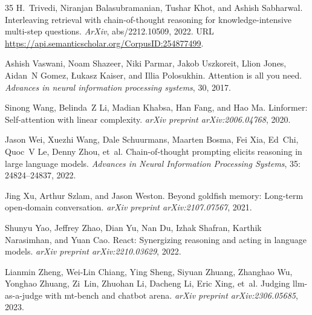 \documentclass[UTF8,fontset=fandol,a4paper,11pt]{ctexart}
\begin{document}
\begin{thebibliography}{35}
H.~Trivedi, Niranjan Balasubramanian, Tushar Khot, and Ashish Sabharwal.
\newblock Interleaving retrieval with chain-of-thought reasoning for knowledge-intensive multi-step questions.
\newblock \emph{ArXiv}, abs/2212.10509, 2022.
\newblock URL \url{https://api.semanticscholar.org/CorpusID:254877499}.

Ashish Vaswani, Noam Shazeer, Niki Parmar, Jakob Uszkoreit, Llion Jones, Aidan~N Gomez, {\L}ukasz Kaiser, and Illia Polosukhin.
\newblock Attention is all you need.
\newblock \emph{Advances in neural information processing systems}, 30, 2017.

Sinong Wang, Belinda~Z Li, Madian Khabsa, Han Fang, and Hao Ma.
\newblock Linformer: Self-attention with linear complexity.
\newblock \emph{arXiv preprint arXiv:2006.04768}, 2020.

Jason Wei, Xuezhi Wang, Dale Schuurmans, Maarten Bosma, Fei Xia, Ed~Chi, Quoc~V Le, Denny Zhou, et~al.
\newblock Chain-of-thought prompting elicits reasoning in large language models.
\newblock \emph{Advances in Neural Information Processing Systems}, 35: 24824--24837, 2022.

Jing Xu, Arthur Szlam, and Jason Weston.
\newblock Beyond goldfish memory: Long-term open-domain conversation.
\newblock \emph{arXiv preprint arXiv:2107.07567}, 2021.

Shunyu Yao, Jeffrey Zhao, Dian Yu, Nan Du, Izhak Shafran, Karthik Narasimhan, and Yuan Cao.
\newblock React: Synergizing reasoning and acting in language models.
\newblock \emph{arXiv preprint arXiv:2210.03629}, 2022.

Lianmin Zheng, Wei-Lin Chiang, Ying Sheng, Siyuan Zhuang, Zhanghao Wu, Yonghao Zhuang, Zi~Lin, Zhuohan Li, Dacheng Li, Eric Xing, et~al.
\newblock Judging llm-as-a-judge with mt-bench and chatbot arena.
\newblock \emph{arXiv preprint arXiv:2306.05685}, 2023.

\end{thebibliography}
\end{document}
